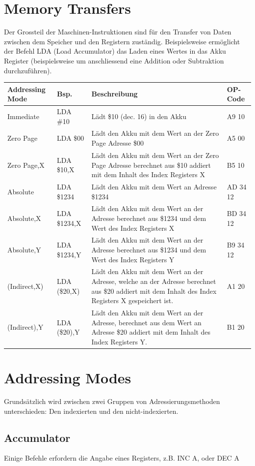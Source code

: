\documentclass[a4paper,10pt]{report}
\begin{document}
\section{Memory Transfers}
Der Grossteil der Maschinen-Instruktionen sind für den Transfer von Daten zwischen dem Speicher und den Registern zuständig. Beispielsweise ermöglicht der Befehl LDA (Load Accumulator) das Laden eines Wertes in das Akku Register (beispielsweise um anschliessend eine Addition oder Subtraktion durchzuführen).
\begin{center}
	\begin{tabularx}{\textwidth}{l|l|X|l}
			\textbf{Addressing Mode} & \textbf{Bsp.} & \textbf{Beschreibung} & \textbf{OP-Code}\\\hline
			Immediate & LDA \#10 & Lädt \$10 (dec. 16) in den Akku & A9 10\\\hline
			Zero Page & LDA \$00 & Lädt den Akku mit dem Wert an der Zero Page Adresse \$00& A5 00\\\hline
			Zero Page,X & LDA \$10,X & Lädt den Akku mit dem Wert an der Zero Page Adresse berechnet aus \$10 addiert mit dem Inhalt des Index Registers X & B5 10 \\\hline
			Absolute & LDA \$1234 & Lädt den Akku mit dem Wert an Adresse \$1234 & AD 34 12\\\hline
			Absolute,X & LDA \$1234,X & Lädt den Akku mit dem Wert an der Adresse berechnet aus \$1234 und dem Wert des Index Registers X & BD 34 12\\\hline
			Absolute,Y & LDA \$1234,Y & Lädt den Akku mit dem Wert an der Adresse berechnet aus \$1234 und dem Wert des Index Registers Y & B9 34 12\\\hline
			(Indirect,X) & LDA (\$20,X) & Lädt den Akku mit dem Wert an der Adresse, welche an der Adresse berechnet aus \$20 addiert mit dem Inhalt des Index Registers X gespeichert ist. & A1 20\\\hline
			(Indirect),Y & LDA (\$20),Y & Lädt den Akku mit dem Wert an der Adresse, berechnet aus dem Wert an Adresse \$20 addiert mit dem Inhalt des Index Registers Y. & B1 20
\end{tabularx}
\end{center}
\section{Addressing Modes}
Grundsätzlich wird zwischen zwei Gruppen von Adressierungsmethoden unterschieden: Den indexierten und den nicht-indexierten. 
\subsection{Accumulator}
Einige Befehle erfordern die Angabe eines Registers, z.B. INC A, oder DEC A
\end{document}

